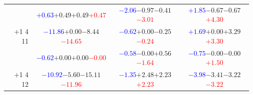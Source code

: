 \documentclass[compress]{beamer}
\begin{document}
\begin{frame}
\begin{tabular}{r | c | c | c}
          & \textcolor{blue}{$+0.63$}\hspace{0.1 cm}$+0.49$\hspace{0.1 cm}$+0.49$\hspace{0.1 cm}\textcolor{red}{$+0.47$} & \textcolor{blue}{$-2.06$}\hspace{0.1 cm}$-0.97$\hspace{0.1 cm}$-0.41$\hspace{0.1 cm}\textcolor{red}{$-3.01$} & \textcolor{blue}{$+1.85$}\hspace{0.1 cm}$-0.67$\hspace{0.1 cm}$-0.67$\hspace{0.1 cm}\textcolor{red}{$+4.30$} \\
$+$1 4 11 & \textcolor{blue}{$-11.86$}\hspace{0.1 cm}$+0.00$\hspace{0.1 cm}$-8.44$\hspace{0.1 cm}\textcolor{red}{$-14.65$} & \textcolor{blue}{$-0.62$}\hspace{0.1 cm}$+0.00$\hspace{0.1 cm}$-0.25$\hspace{0.1 cm}\textcolor{red}{$-0.24$} & \textcolor{blue}{$+1.69$}\hspace{0.1 cm}$+0.00$\hspace{0.1 cm}$+3.29$\hspace{0.1 cm}\textcolor{red}{$+3.30$} \\
          & \textcolor{blue}{$-0.62$}\hspace{0.1 cm}$+0.00$\hspace{0.1 cm}$+0.00$\hspace{0.1 cm}\textcolor{red}{$-0.00$} & \textcolor{blue}{$-0.58$}\hspace{0.1 cm}$-0.00$\hspace{0.1 cm}$+0.56$\hspace{0.1 cm}\textcolor{red}{$-1.64$} & \textcolor{blue}{$-0.75$}\hspace{0.1 cm}$-0.00$\hspace{0.1 cm}$-0.00$\hspace{0.1 cm}\textcolor{red}{$+1.50$} \\
$+$1 4 12 & \textcolor{blue}{$-10.92$}\hspace{0.1 cm}$-5.60$\hspace{0.1 cm}$-15.11$\hspace{0.1 cm}\textcolor{red}{$-11.96$} & \textcolor{blue}{$-1.35$}\hspace{0.1 cm}$+2.48$\hspace{0.1 cm}$+2.23$\hspace{0.1 cm}\textcolor{red}{$+2.23$} & \textcolor{blue}{$-3.98$}\hspace{0.1 cm}$-3.41$\hspace{0.1 cm}$-3.22$\hspace{0.1 cm}\textcolor{red}{$-3.22$} \\

\end{tabular}
\end{frame}
\end{document}

